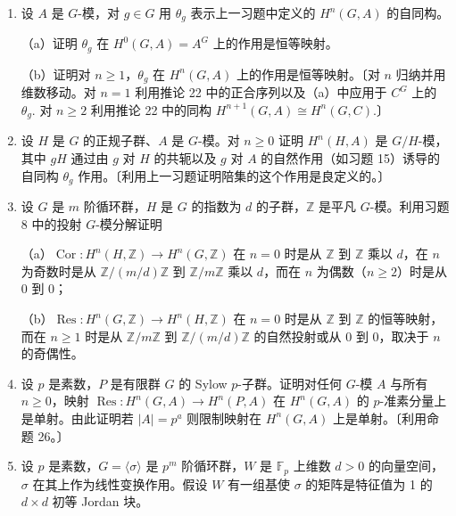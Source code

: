 \begin{enumerate}
（c）证明 \(\theta_g\) 在 \(H^0(H, A)\) 上的作用就是习题 4 中的自同构。

\item 设 \(A\) 是 \(G\)-模，对 \(g \in G\) 用 \(\theta_g\) 表示上一习题中定义的 \(H^n(G, A)\) 的自同构。

（a）证明 \(\theta_g\) 在 \(H^0(G, A) = A^G\) 上的作用是恒等映射。

（b）证明对 \(n \geq 1\)，\(\theta_g\) 在 \(H^n(G, A)\) 上的作用是恒等映射。〔对 \(n\) 归纳并用维数移动。对 \(n = 1\) 利用推论 22 中的正合序列以及（a）中应用于 \(C^G\) 上的 \(\theta_g\). 对 \(n \geq 2\) 利用推论 22 中的同构 \(H^{n+1}(G, A) \cong H^n(G, C)\).〕

\item 设 \(H\) 是 \(G\) 的正规子群、\(A\) 是 \(G\)-模。对 \(n \geq 0\) 证明 \(H^n(H, A)\) 是 \(G/H\)-模，其中 \(gH\) 通过由 \(g\) 对 \(H\) 的共轭以及 \(g\) 对 \(A\) 的自然作用（如习题 15）诱导的自同构 \(\theta_g\) 作用。〔利用上一习题证明陪集的这个作用是良定义的。〕

\item 设 \(G\) 是 \(m\) 阶循环群，\(H\) 是 \(G\) 的指数为 \(d\) 的子群，\(\mathbb{Z}\) 是平凡 \(G\)-模。利用习题 8 中的投射 \(G\)-模分解证明

（a）\(\operatorname{Cor} : H^n(H, \mathbb{Z}) \to H^n(G, \mathbb{Z})\) 在 \(n = 0\) 时是从 \(\mathbb{Z}\) 到 \(\mathbb{Z}\) 乘以 \(d\)，在 \(n\) 为奇数时是从 \(\mathbb{Z}/(m/d)\mathbb{Z}\) 到 \(\mathbb{Z}/m\mathbb{Z}\) 乘以 \(d\)，而在 \(n\) 为偶数（\(n \geq 2\)）时是从 0 到 0；

（b）\(\operatorname{Res} : H^n(G, \mathbb{Z}) \to H^n(H, \mathbb{Z})\) 在 \(n = 0\) 时是从 \(\mathbb{Z}\) 到 \(\mathbb{Z}\) 的恒等映射，而在 \(n \geq 1\) 时是从 \(\mathbb{Z}/m\mathbb{Z}\) 到 \(\mathbb{Z}/(m/d)\mathbb{Z}\) 的自然投射或从 0 到 0，取决于 \(n\) 的奇偶性。

\item 设 \(p\) 是素数，\(P\) 是有限群 \(G\) 的 Sylow \(p\)-子群。证明对任何 \(G\)-模 \(A\) 与所有 \(n \geq 0\)，映射 \(\operatorname{Res} : H^n(G, A) \to H^n(P, A)\) 在 \(H^n(G, A)\) 的 \(p\)-准素分量上是单射。由此证明若 \(|A| = p^a\) 则限制映射在 \(H^n(G, A)\) 上是单射。〔利用命题 26。〕

\item 设 \(p\) 是素数，\(G = \langle\sigma\rangle\) 是 \(p^m\) 阶循环群，\(W\) 是 \(\mathbb{F}_p\) 上维数 \(d > 0\) 的向量空间，\(\sigma\) 在其上作为线性变换作用。假设 \(W\) 有一组基使 \(\sigma\) 的矩阵是特征值为 1 的 \(d \times d\) 初等 Jordan 块。


\end{enumerate}
